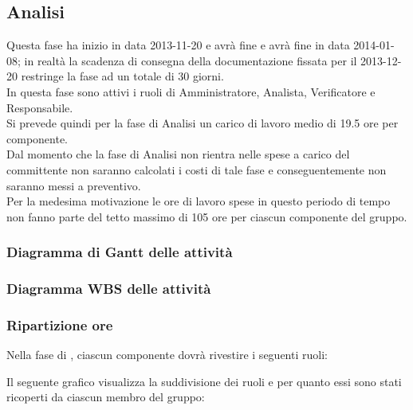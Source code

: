 \subsection{Analisi}
Questa fase ha inizio in data 2013-11-20 e avrà fine e avrà fine in data 2014-01-08; in realtà la scadenza di consegna della documentazione fissata per il 2013-12-20 restringe la fase ad un totale di 30 giorni.\\
In questa fase sono attivi i ruoli di Amministratore, Analista, Verificatore e Responsabile.\\
Si prevede quindi per la fase di Analisi un carico di lavoro medio di 19.5 ore per componente.\\
Dal momento che la fase di Analisi non rientra nelle spese a carico del committente non saranno calcolati i costi di tale fase e conseguentemente non saranno messi a preventivo.\\
Per la medesima motivazione le ore di lavoro spese in questo periodo di tempo non fanno parte del tetto massimo di 105 ore per ciascun componente del gruppo.

\subsubsection{Diagramma di Gantt delle attività}

\newpage
\subsubsection{Diagramma WBS delle attività}

\newpage
\subsubsection{Ripartizione ore}

\newpage
Nella fase di , ciascun componente dovrà rivestire i seguenti ruoli:

Il seguente grafico visualizza la suddivisione dei ruoli e per quanto essi sono stati ricoperti da ciascun membro del gruppo:
